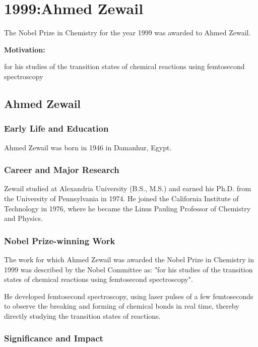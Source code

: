 \chapter{1999:Ahmed Zewail}

\label{chap:chemistry1999}

The Nobel Prize in Chemistry for the year 1999 was awarded to Ahmed Zewail.

\textbf{Motivation:}

for his studies of the transition states of chemical reactions using femtosecond spectroscopy

\section{Ahmed Zewail}

\subsection*{Early Life and Education}

Ahmed Zewail was born in 1946 in Damanhur, Egypt.

\subsection*{Career and Major Research}

Zewail studied at Alexandria University (B.S., M.S.) and earned his Ph.D. from the University of Pennsylvania in 1974. He joined the California Institute of Technology in 1976, where he became the Linus Pauling Professor of Chemistry and Physics.

\subsection*{Nobel Prize-winning Work}

The work for which Ahmed Zewail was awarded the Nobel Prize in Chemistry in 1999 was described by the Nobel Committee as: "for his studies of the transition states of chemical reactions using femtosecond spectroscopy".

He developed femtosecond spectroscopy, using laser pulses of a few femtoseconds to observe the breaking and forming of chemical bonds in real time, thereby directly studying the transition states of reactions.

\subsection*{Significance and Impact}

